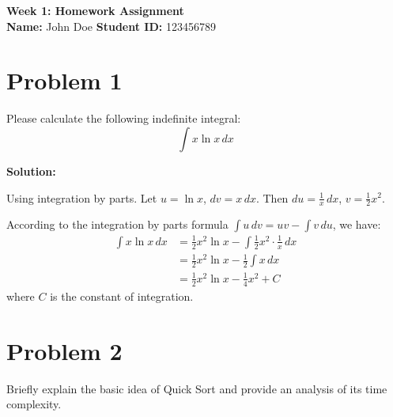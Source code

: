 \documentclass[12pt,a4paper]{article}
\newenvironment{solution}{\begin{mdframed}[linewidth=1pt,linecolor=black]\noindent\textbf{Solution:}\par\vspace{0.2cm}}{\end{mdframed}\vspace{0.5cm}}
\begin{document}
\begin{center}
    \LARGE \textbf{Week 1: Homework Assignment} \\[0.3cm]
    \large \textbf{Name:} John Doe \quad \textbf{Student ID:} 123456789
\end{center}
\vspace{0.5cm}

\section*{Problem 1}
Please calculate the following indefinite integral:
\begin{equation}
    \int x \ln x \, dx
\end{equation}

\begin{solution}
Using integration by parts. Let $u = \ln x$, $dv = x \, dx$.
Then $du = \frac{1}{x} \, dx$, $v = \frac{1}{2}x^2$.

According to the integration by parts formula $\int u \, dv = uv - \int v \, du$, we have:
\begin{align*}
    \int x \ln x \, dx &= \frac{1}{2}x^2 \ln x - \int \frac{1}{2}x^2 \cdot \frac{1}{x} \, dx \\
    &= \frac{1}{2}x^2 \ln x - \frac{1}{2} \int x \, dx \\
    &= \frac{1}{2}x^2 \ln x - \frac{1}{4}x^2 + C
\end{align*}
where $C$ is the constant of integration.
\end{solution}

\section*{Problem 2}
Briefly explain the basic idea of Quick Sort and provide an analysis of its time complexity.
\end{document}
